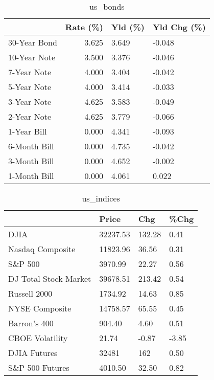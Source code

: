 \documentclass{article}%
\begin{document}
%


\begin{table}[htbp]%
\caption{us\_bonds}%
\centering%
\begin{adjustbox}{width=1\textwidth}%
\begin{tabular}{lrll}
\toprule
             &  Rate (\%) & Yld (\%) & Yld Chg (\%) \\
\midrule
30-Year Bond &     3.625 &   3.649 &      -0.048 \\
10-Year Note &     3.500 &   3.376 &      -0.046 \\
 7-Year Note &     4.000 &   3.404 &      -0.042 \\
 5-Year Note &     4.000 &   3.414 &      -0.033 \\
 3-Year Note &     4.625 &   3.583 &      -0.049 \\
 2-Year Note &     4.625 &   3.779 &      -0.066 \\
 1-Year Bill &     0.000 &   4.341 &      -0.093 \\
6-Month Bill &     0.000 &   4.735 &      -0.042 \\
3-Month Bill &     0.000 &   4.652 &      -0.002 \\
1-Month Bill &     0.000 &   4.061 &       0.022 \\
\bottomrule
\end{tabular}
%
\end{adjustbox}%
\end{table}

%


\begin{table}[htbp]%
\caption{us\_indices}%
\centering%
\begin{adjustbox}{width=1\textwidth}%
\begin{tabular}{llll}
\toprule
                      &    Price &    Chg &  \%Chg \\
\midrule
                 DJIA & 32237.53 & 132.28 &  0.41 \\
     Nasdaq Composite & 11823.96 &  36.56 &  0.31 \\
              S\&P 500 &  3970.99 &  22.27 &  0.56 \\
DJ Total Stock Market & 39678.51 & 213.42 &  0.54 \\
         Russell 2000 &  1734.92 &  14.63 &  0.85 \\
       NYSE Composite & 14758.57 &  65.55 &  0.45 \\
         Barron's 400 &   904.40 &   4.60 &  0.51 \\
      CBOE Volatility &    21.74 &  -0.87 & -3.85 \\
         DJIA Futures &    32481 &    162 &  0.50 \\
      S\&P 500 Futures &  4010.50 &  32.50 &  0.82 \\
\bottomrule
\end{tabular}
%
\end{adjustbox}%
\end{table}
\end{document}
